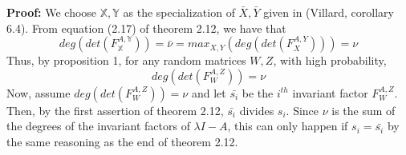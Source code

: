 \documentclass[12pt]{article}
\begin{document}
\noindent\textbf{Proof:} 
We choose $\mathbb{X},\mathbb{Y}$ as the specialization of $\bar{X},\bar{Y}$ given in (Villard, corollary 6.4). From equation
(2.17) of theorem 2.12, we have that
$$ deg(det(F_{\mathbb{X}}^{A,\mathbb{Y}})) = \bar{\nu} = max_{X,Y}(deg(det(F_X^{A,Y}))) = \nu $$
Thus, by proposition 1, for any random matrices $W,Z$, with high probability,
$$ deg(det(F_W^{A,Z})) = \nu$$
Now, assume $deg(det(F_W^{A,Z})) = \nu$ and 
let $\bar{s_i}$ be the $i^{th}$ invariant factor $F_W^{A,Z}$. Then, by the first assertion of theorem 2.12, $\bar{s_i}$ divides $s_i$. Since
$\nu$ is the sum of the degrees of the invariant factors of $\lambda I - A$, this can only happen if $s_i = \bar{s_i}$ by the same reasoning as the end of theorem 2.12.
\end{document}
